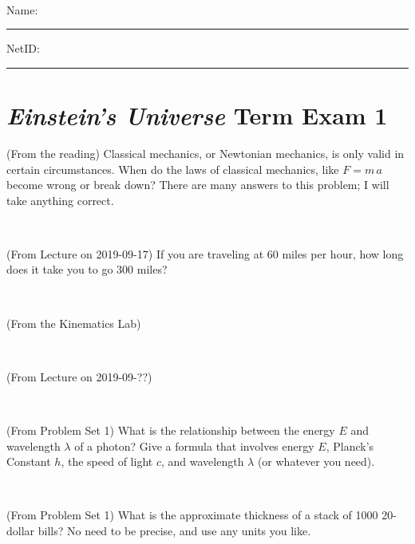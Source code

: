 \documentclass[12pt, letterpaper]{article}
\begin{document}
\vfill ~


\cleardoublepage



\noindent
Name: \rule[-1ex]{0.60\textwidth}{0.1pt}
NetID: \rule[-1ex]{0.20\textwidth}{0.1pt}

\section*{\textsl{Einstein's Universe} Term Exam 1}
\setcounter{problem}{1}


\begin{problem} (From the reading)
Classical mechanics, or Newtonian mechanics, is only valid in certain
circumstances. When do the laws of classical mechanics, like $F =
m\,a$ become wrong or break down? There are many answers to this
problem; I will take anything correct.
\end{problem}


\vfill ~

\begin{problem} (From Lecture on 2019-09-17)
If you are traveling at 60 miles per hour, how long does
it take you to go 300 miles?
\end{problem}


\vfill ~

\begin{problem} (From the Kinematics Lab)

\end{problem}


\vfill ~

\begin{problem} (From Lecture on 2019-09-??)
\end{problem}


\vfill ~


\clearpage


\begin{problem} (From Problem Set 1)
What is the relationship between the energy $E$ and wavelength
$\lambda$ of a photon? Give a formula that involves energy $E$,
Planck's Constant $h$, the speed of light $c$, and wavelength
$\lambda$ (or whatever you need).
\end{problem}

\vfill ~

\begin{problem} (From Problem Set 1)
What is the approximate thickness of a stack of 1000 20-dollar bills?
No need to be precise, and use any units you like.
\end{problem}
\end{document}
